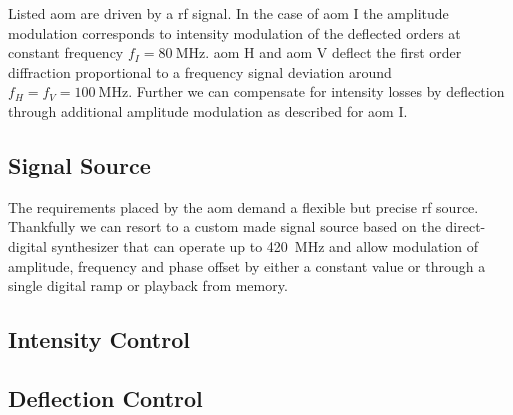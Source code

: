 Listed \gls{aom} are driven by a \gls{rf} signal. In the case of \gls{aom} I
the amplitude modulation corresponds to intensity modulation of the deflected
orders at constant frequency $f_I=\SI{80}{\mega\hertz}$. \gls{aom} H
and \gls{aom} V deflect the first order diffraction proportional to
a frequency signal deviation around $f_H=f_V=\SI{100}{\mega\hertz}$. Further
we can compensate for intensity losses by deflection through additional
amplitude modulation as described for \gls{aom} I.

\subsection{Signal Source}

The requirements placed by the \gls{aom} demand a flexible but precise
\gls{rf} source. Thankfully we can resort to a custom made signal source
based on the \cite{AD9910} direct-digital synthesizer that can operate up to
\SI{420}{\mega\hertz} and allow modulation of amplitude, frequency and phase
offset by either a constant value or through a single digital ramp or playback
from memory.

\subsection{Intensity Control}


\subsection{Deflection Control}

